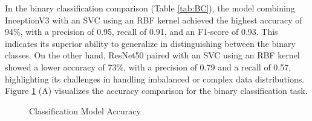 \documentclass[12pt,a4paper]{report}
\begin{document}
\hspace{1cm}In the binary classification comparison (Table \ref{tab:BC}), the model combining InceptionV3 with an SVC using an RBF kernel achieved the highest accuracy of 94\%, with a precision of 0.95, recall of 0.91, and an F1-score of 0.93. This indicates its superior ability to generalize in distinguishing between the binary classes. On the other hand, ResNet50 paired with an SVC using an RBF kernel showed a lower accuracy of 73\%, with a precision of 0.79 and a recall of 0.57, highlighting its challenges in handling imbalanced or complex data distributions. Figure \ref{fig:Model_Accuracy} (A) visualizes the accuracy comparison for the binary classification task.

\begin{figure}[h]
	\renewcommand\thefigure{4.2}
	\centering
	\caption{Classification Model Accuracy}
	\label{fig:Model_Accuracy}
\end{figure}
\end{document}
